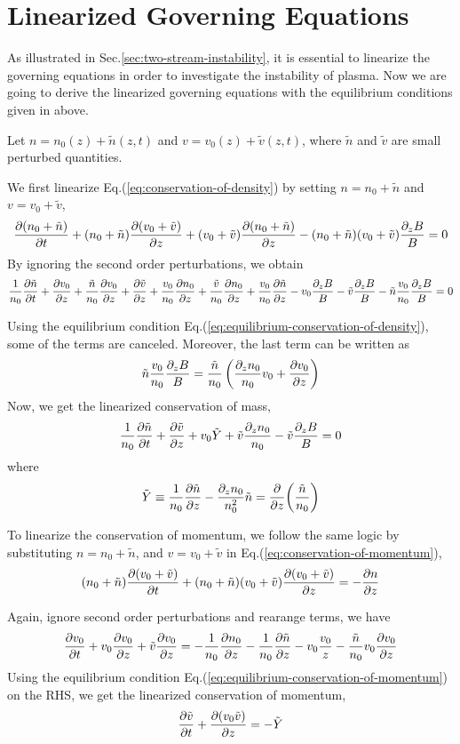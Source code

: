 \section{Linearized Governing Equations}
As illustrated in Sec.\ref{sec:two-stream-instability}, it is essential to linearize the governing equations in order to investigate the instability of plasma. Now we are going to derive the linearized governing equations with the equilibrium conditions given in above.

Let $n = n_0(z) + \tilde{n}(z,t)$ and $v = v_0(z) + \tilde{v}(z,t)$, where $\tilde{n}$ and $\tilde{v}$ are small perturbed quantities.

We first linearize Eq.(\ref{eq:conservation-of-density}) by setting $n=n_0+\tilde{n}$ and $v=v_0+\tilde{v}$,
\[    \pdv{(n_0+\tilde{n})}{t}
	+ (n_0+\tilde{n})\pdv{(v_0+\tilde{v})}{z}
	+ (v_0+\tilde{v})\pdv{(n_0+\tilde{n})}{z}
	- (n_0+\tilde{n})(v_0+\tilde{v})\frac{\partial_z B}{B} = 0
\]
By ignoring the second order perturbations, we obtain
\[ \frac{1}{n_0}\pdv{\tilde{n}}{t}
	+ \pdv{v_0}{z} + \frac{\tilde{n}}{n_0}\pdv{v_0}{z} + \pdv{\tilde{v}}{z}
	+ \frac{v_0}{n_0}\pdv{n_0}{z} + \frac{\tilde{v}}{n_0}\pdv{n_0}{z} + \frac{v_0}{n_0}\pdv{\tilde{n}}{z}
	- v_0\frac{\partial_z B}{B} - \tilde{v}\frac{\partial_z B}{B} - \tilde{n}\frac{v_0}{n_0}\frac{\partial_z B}{B} = 0
\]


Using the equilibrium condition Eq.(\ref{eq:equilibrium-conservation-of-density}), some of the terms are canceled. Moreover, the last term can be written as
\[ \tilde{n}\frac{v_0}{n_0}\frac{\partial_z B}{B} = \frac{\tilde{n}}{n_0}\left( \frac{\partial_z n_0}{n_0}v_0 + \pdv{v_0}{z} \right) \]
Now, we get the linearized conservation of mass,
\begin{equation} \label{eq:linearized-conservation-of-density}
	\frac{1}{n_0}\pdv{\tilde{n}}{t}
	+ \pdv{\tilde{v}}{z} + v_0\tilde{Y} + \tilde{v}\frac{\partial_z n_0}{n_0} - \tilde{v}\frac{\partial_z B}{B} = 0
\end{equation}
where
\[ \tilde{Y} \equiv \frac{1}{n_0}\pdv{\tilde{n}}{z} - \frac{\partial_z n_0}{n_0^2}\tilde{n} = \pdv{z}(\frac{\tilde{n}}{n_0}) \]

To linearize the conservation of momentum, we follow the same logic by substituting $n=n_0+\tilde{n}$, and $v=v_0+\tilde{v}$ in Eq.(\ref{eq:conservation-of-momentum}),
\[ (n_0+\tilde{n})\pdv{(v_0+\tilde{v})}{t} + (n_0+\tilde{n})(v_0+\tilde{v})\pdv{(v_0+\tilde{v})}{z} = -\pdv{n}{z} \]

Again, ignore second order perturbations and rearange terms, we have
\[ \pdv{v_0}{t} + v_0\pdv{v_0}{z} + \tilde{v}\pdv{v_0}{z}
	= -\frac{1}{n_0}\pdv{n_0}{z} -\frac{1}{n_0}\pdv{\tilde{n}}{z} -v_0\frac{v_0}{z} - \frac{\tilde{n}}{n_0}v_0\pdv{v_0}{z} \]
Using the equilibrium condition Eq.(\ref{eq:equilibrium-conservation-of-momentum}) on the RHS, we get the linearized conservation of momentum,
\begin{equation} \label{eq:linearized-conservation-of-momentum}
	\pdv{\tilde{v}}{t} + \pdv{(v_0\tilde{v})}{z} = -\tilde{Y}
\end{equation}

